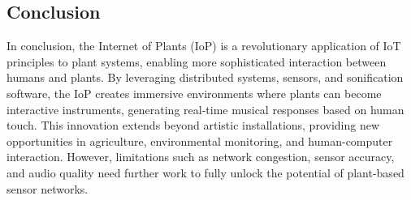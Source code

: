 \subsection{Conclusion}

In conclusion, the Internet of Plants (IoP) is a revolutionary application of IoT principles to plant systems, enabling more sophisticated interaction between humans and plants. By leveraging distributed systems, sensors, and sonification software, the IoP creates immersive environments where plants can become interactive instruments, generating real-time musical responses based on human touch. This innovation extends beyond artistic installations, providing new opportunities in agriculture, environmental monitoring, and human-computer interaction. However, limitations such as network congestion, sensor accuracy, and audio quality need further work to fully unlock the potential of plant-based sensor networks.

